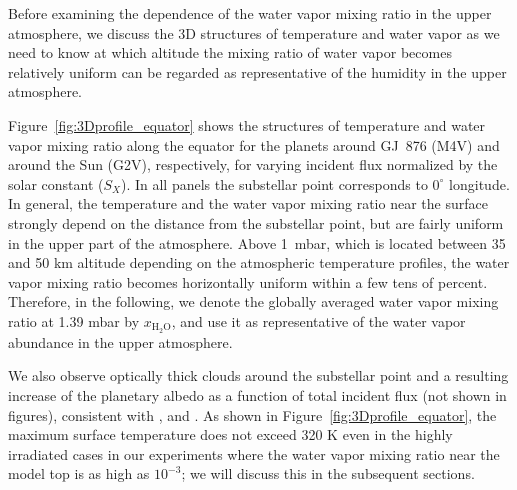 \documentclass[11pt,numberedappendix,twocolappendix,]{emulateapj}
\def\water{H$_2$O}
\def\xwater{$x_\text{\water}$}
\def\preslevel{1.39 mbar}
\def\wv{water vapor}
\def\revise#1{{\color{red}{#1}}}
\begin{document}
Before examining the dependence of the \wv{} mixing ratio in the upper atmosphere, we discuss the 3D structures of temperature and water vapor as we need to know at which altitude the mixing ratio of \wv{} becomes relatively uniform \revise{and hence} %
can be regarded as representative of the humidity in the upper atmosphere. 

Figure~\ref{fig:3Dprofile_equator} shows the structures of temperature and  \wv{} mixing ratio along the equator for the planets around GJ~876 (M4V) and around the Sun (G2V), respectively, for varying incident flux normalized by the solar constant ($S_X$). 
In all panels the substellar point corresponds to $0^{\circ }$ longitude. 
In general, the temperature and the \wv{} mixing ratio near the surface strongly depend on the distance from the substellar point, but are fairly uniform in the upper part of the atmosphere. 
Above \revise{about} 1~mbar, which is located between 35 and 50 km altitude depending on the atmospheric temperature profiles, the \wv{} mixing ratio becomes horizontally uniform within a few tens of percent. 
Therefore, in the following, we denote the globally averaged \wv{} mixing ratio at \preslevel{} by \xwater{}, and use it as representative of the \wv{} abundance in the upper atmosphere. 

We also observe optically thick clouds around the substellar point and a resulting increase of the planetary albedo as a function of total incident flux (not shown in figures), consistent with \citet{Yang2013,Yang2014}, \citet{Kopparapu2016} and \citet{Way2016}. 
As shown in Figure~\ref{fig:3Dprofile_equator}, the maximum surface temperature does not exceed 320 K even in the highly irradiated cases in our experiments where the \wv{} mixing ratio near the model top is as high as $10^{-3}$; we will discuss this in the subsequent sections. 
\end{document}
